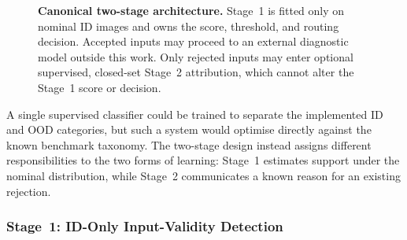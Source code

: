 \documentclass[fleqn,12pt]{olplainarticle}
\begin{document}
\begin{figure}[htbp]
    \caption[Canonical two-stage FAF input-control architecture.]{
    \textbf{Canonical two-stage architecture.} Stage~1 is fitted only on
    nominal ID images and owns the score, threshold, and routing decision.
    Accepted inputs may proceed to an external diagnostic model outside this
    work. Only rejected inputs may enter optional supervised, closed-set
    Stage~2 attribution, which cannot alter the Stage~1 score or decision.}
    \label{fig:system_pipeline_overview}
\end{figure}

A single supervised classifier could be trained to separate the implemented
ID and OOD categories, but such a system would optimise directly against the
known benchmark taxonomy. The two-stage design instead assigns different
responsibilities to the two forms of learning: Stage~1 estimates support under
the nominal distribution, while Stage~2 communicates a known reason for an
existing rejection.

\subsubsection{Stage~1: ID-Only Input-Validity Detection}
\label{subsubsec:stage1_design}
\end{document}

